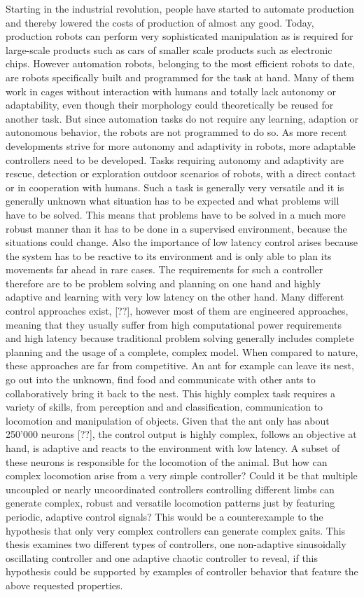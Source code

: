 \documentclass[main]{subfiles}
\begin{document}
Starting in the industrial revolution, people have started to automate production and thereby lowered the costs of production of almost any good. Today, production robots can perform very sophisticated manipulation as is required for large-scale products such as cars of smaller scale products such as electronic chips. However automation robots, belonging to the most efficient robots to date, are robots specifically built and programmed for the task at hand. Many of them work in cages without interaction with humans and totally lack autonomy or adaptability, even though their morphology could theoretically be reused for another task. But since automation tasks do not require any learning, adaption or autonomous behavior, the robots are not programmed to do so. As more recent developments strive for more autonomy and adaptivity in robots, more adaptable controllers need to be developed. Tasks requiring autonomy and adaptivity are rescue, detection or exploration outdoor scenarios of robots, with a direct contact or in cooperation with humans. Such a task is generally very versatile and it is generally unknown what situation has to be expected and what problems will have to be solved. This means that problems have to be solved in a much more robust manner than it has to be done in a supervised environment, because the situations could change. Also the importance of low latency control arises because the system has to be reactive to its environment and is only able to plan its movements far ahead in rare cases. The requirements for such a controller therefore are to be problem solving and planning on one hand and highly adaptive and learning with very low latency on the other hand. Many different control approaches exist, [??], however most of them are engineered approaches, meaning that they usually suffer from high computational power requirements and high latency because traditional problem solving generally includes complete planning and the usage of a complete, complex model. When compared to nature, these approaches are far from competitive. An ant for example can leave its nest, go out into the unknown, find food and communicate with other ants to collaboratively bring it back to the nest. This highly complex task requires a variety of skills, from perception and and classification, communication to locomotion and manipulation of objects. Given that the ant only has about 250'000 neurons [??], the control output is highly complex, follows an objective at hand, is adaptive and reacts to the environment with low latency. A subset of these neurons is responsible for the locomotion of the animal. But how can complex locomotion arise from a very simple controller? Could it be that multiple uncoupled or nearly uncoordinated controllers controlling different limbs can generate complex, robust and versatile locomotion patterns just by featuring periodic, adaptive control signals? This would be a counterexample to the hypothesis that only very complex controllers can generate complex gaits. This thesis examines two different types of controllers, one non-adaptive sinusoidally oscillating controller and one adaptive chaotic controller to reveal, if this hypothesis could be supported by examples of controller behavior that feature the above requested properties.
\end{document}

